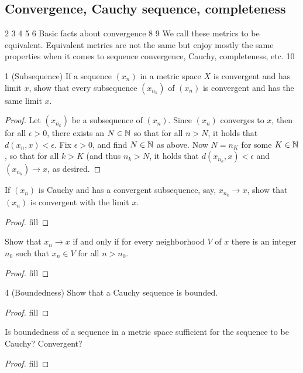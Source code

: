 \subsection{Convergence, Cauchy sequence, completeness}

2
3
4
5
6 Basic facts about convergence
8
9 We call these metrics to be equivalent. Equivalent metrics are not the same but enjoy mostly the same properties when it comes to sequence convergence, Cauchy, completeness, etc.
10

\begin{exercise}{1 (Subsequence)}
If a sequence $(x_n)$ in a metric space $X$ is convergent and has limit $x$, show that every subsequence $(x_{n_k})$ of $(x_n)$ is convergent and has the same limit $x$.
\end{exercise}
\begin{proof}
Let $(x_{n_k})$ be a subsequence of $(x_n)$. Since $(x_n)$ converges to $x$, then for all $\epsilon>0$, there exists an $N\in\mathbb{N}$ so that for all $n>N$, it holds that $d(x_n,x)<\epsilon$. Fix $\epsilon>0$, and find $N\in\mathbb{N}$ as above. Now $N=n_K$ for some $K\in\mathbb{N}$, so that for all $k>K$ (and thus $n_k>N$, it holds that $d(x_{n_k},x)<\epsilon$ and $(x_{n_k})\to x$, as desired.
\end{proof}

\begin{exercise}{2}
If $(x_n)$ is Cauchy and has a convergent subsequence, say, $x_{n_k}\to x$, show that $(x_n)$ is convergent with the limit $x$.
\end{exercise}
\begin{proof}
fill
\end{proof}

\begin{exercise}{3}
Show that $x_n\to x$ if and only if for every neighborhood $V$ of $x$ there is an integer $n_0$ such that $x_n\in V$ for all $n>n_0$.
\end{exercise}
\begin{proof}
fill
\end{proof}

\begin{exercise}{4 (Boundedness)}
Show that a Cauchy sequence is bounded.
\end{exercise}
\begin{proof}
fill
\end{proof}

\begin{exercise}{5}
Is boundedness of a sequence in a metric space sufficient for the sequence to be Cauchy? Convergent?
\end{exercise}
\begin{proof}
fill
\end{proof}

